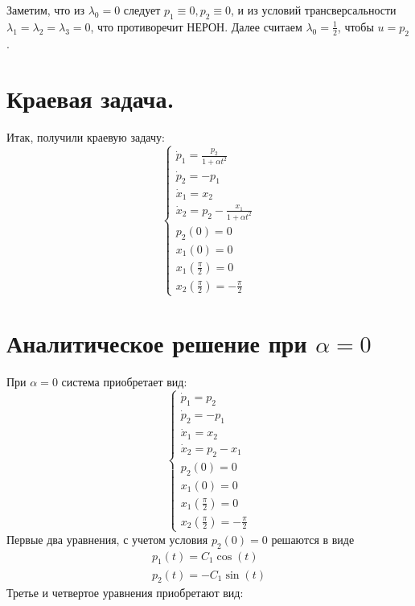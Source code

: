 \documentclass{article}
\begin{document}
Заметим, что из $\lambda_{0} = 0$ следует $p_{1} \equiv 0, p_{2} \equiv 0$, и из условий
трансверсальности $\lambda_{1} = \lambda_{2} = \lambda_{3} = 0$, что противоречит НЕРОН.
Далее считаем $\lambda_{0} = \frac{1}{2}$, чтобы $u = p_{2}$.
\section{Краевая задача.}
Итак, получили краевую задачу:
$$\begin{cases}
  \dot p_{1} = \frac{p_{2}}{1 + \alpha t^{2}}\\
  \dot p_{2} = -p_{1}\\
 \dot x_{1} = x_{2}\\
 \dot x_{2} = p_{2} - \frac{x_{1}}{1 + \alpha t^{2}}\\
  p_{2}(0) = 0\\
  x_1(0) = 0\\
  x_{1}(\frac \pi 2) = 0\\
  x_2(\frac \pi 2) = -\frac \pi 2
\end{cases}$$
\section{Аналитическое решение при $\alpha = 0$}
При $\alpha = 0$ система приобретает вид:
$$\begin{cases}
  \dot p_{1} = p_{2}\\
  \dot p_{2} = -p_{1}\\
  \dot x_{1} = x_{2}\\
  \dot x_{2} = p_{2} - x_{1}\\
  p_{2}(0) = 0\\
  x_1(0) = 0\\
  x_{1}(\frac \pi 2) = 0\\
  x_2(\frac \pi 2) = -\frac \pi 2
\end{cases}$$
Первые два уравнения, с учетом условия $p_{2}(0) = 0$ решаются в виде
\begin{gather*}
  p_{1}(t) = C_{1}\cos(t)\\
  p_{2}(t) = -C_{1}\sin(t)
\end{gather*}
Третье и четвертое уравнения приобретают вид:
\end{document}
